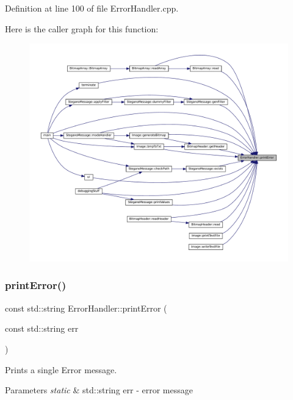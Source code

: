 Definition at line 100 of file Error\+Handler.\+cpp.

Here is the caller graph for this function\+:\nopagebreak
\begin{figure}[H]
\begin{center}
\leavevmode
\includegraphics[width=350pt]{classErrorHandler_ab90b8248f24e3129df69d224585956dd_icgraph}
\end{center}
\end{figure}
\mbox{\label{classErrorHandler_ad1e6aa8018e2a22460a1431e6e7d8804}} 
\subsubsection{\texorpdfstring{printError()}{printError()}\hspace{0.1cm}{\footnotesize\ttfamily [2/2]}}
{\footnotesize\ttfamily const std\+::string Error\+Handler\+::print\+Error (\begin{DoxyParamCaption}\item[{const std\+::string}]{err }\end{DoxyParamCaption})}



Prints a single Error message. 


\begin{DoxyParams}{Parameters}
{\em static} & std\+::string err -\/ error message \\
\hline
\end{DoxyParams}


